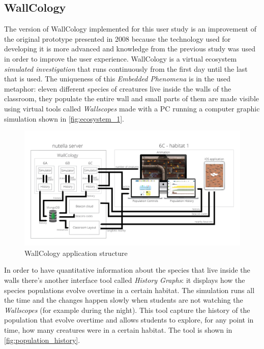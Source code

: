 \subsection{WallCology}
The version of WallCology implemented for this user study is an improvement of the original prototype presented in 2008 because the technology used for developing it is more advanced and knowledge from the previous study was used in order to improve the user experience. WallCology is a virtual ecosystem \textit{simulated investigation} that runs continuously from the first day until the last that is used. The uniqueness of this \textit{Embedded Phenomena} is in the used metaphor: eleven different species of creatures live inside the walls of the classroom, they populate the entire wall and small parts of them are made visible using virtual tools called \textit{Wallscopes} made with a PC running a computer graphic simulation shown in \ref{fig:ecosystem_1}. 

\begin{figure}
\centering
\includegraphics[width=6in]{images/wallcology-structure.png}
\caption{WallCology application structure}
\label{fig:wallscopes}
\end{figure}

In order to have quantitative information about the species that live inside the walls there's another interface tool called \textit{History Graphs}: it displays how the species populations evolve overtime in a certain habitat. The simulation runs all the time and the changes happen slowly when students are not watching the \textit{Wallscopes} (for example during the night). This tool capture the history of the population that evolve overtime and allows students to explore, for any point in time, how many creatures were in a certain habitat. The tool is shown in \ref{fig:population_history}.

